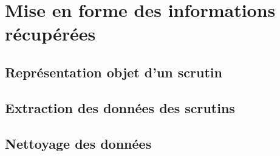 \section{Mise en forme des informations récupérées}

\subsection{Représentation objet d'un scrutin}

\subsection{Extraction des données des scrutins}

\subsection{Nettoyage des données}
